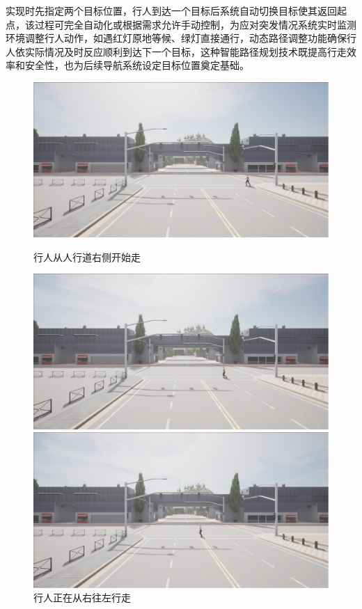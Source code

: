 实现时先指定两个目标位置，行人到达一个目标后系统自动切换目标使其返回起点，该过程可完全自动化或根据需求允许手动控制，为应对突发情况系统实时监测环境调整行人动作，如遇红灯原地等候、绿灯直接通行，动态路径调整功能确保行人依实际情况及时反应顺利到达下一个目标，这种智能路径规划技术既提高行走效率和安全性，也为后续导航系统设定目标位置奠定基础。

\begin{figure}[H]
    \centering
    \begin{minipage}{0.24\textwidth}
        \centering
        \includegraphics[width=\textwidth]{images/crossing_walking1.pdf}
        \caption{行人从人行道右侧开始走}
    \end{minipage}%
    \begin{minipage}{0.24\textwidth}
        \centering
        \includegraphics[width=\textwidth]{images/crossing_walking2.pdf}
        \caption{行人正在从右往左行走}
    \end{minipage}%
    \begin{minipage}{0.24\textwidth}
        \centering
        \includegraphics[width=\textwidth]{images/crossing_walking3.pdf}

\end{minipage}
\end{figure}
